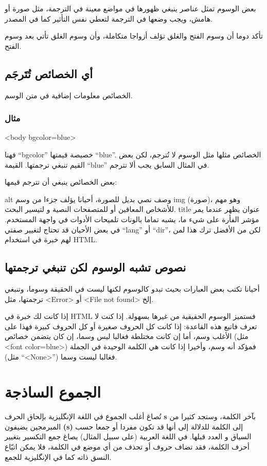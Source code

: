 بعض الوسوم تمثل عناصر ينبغي ظهورها في مواضع معينة في الترجمة، مثل صورة
أو هامش، ويجب وضعها في الترجمة لتعطي نفس التأثير كما في المصدر.

تأكد دوما أن وسوم الفتح والغلق تؤلف أزواجا متكاملة، وأن وسوم الغلق تأتي
بعد وسوم الفتح.

\subsection{أي الخصائص تُتَرجَم}
الخصائص معلومات إضافية في متن الوسم.

\subsubsection{مثال}
<body bgcolor=blue>

فهنا “bgcolor” خصيصة قيمتها “blue”. الخصائص مثلها مثل الوسوم لا تُترجم،
لكن بعض القيم تنبغي ترجمتها. القيمة “blue” في المثال السابق يجب ألا
تترجم.

بعض الخصائص ينبغي أن تترجم قيمها:

\starttable[|l|l|]
\HL
\NC {} \NC {}\NC\AR
\HL
\NC alt  \NC وصف نصي بديل للصورة، أحيانا يؤلف جزءا من وسم img (صورة)،
وهو مهم للأشخاص المعاقين أو للمتصفحات النصية و لتيسير البحث.\NC\AR
\HL
\NC title  \NC عنوان يظهر عندما يمر مؤشر الفأرة على شيء ما، يشبه تماما
بالونات تلميحات الأدوات في واجهة المستخدم.\NC\AR
\HL
\stoptable
في بعض الأحيان قد تحتاج لتغيير صفتي “lang” أو “dir”، لكن من الأفضل ترك
هذا لمن لهم خبرة في استخدام HTML.

\subsection{نصوص تشبه الوسوم لكن تنبغي ترجمتها}
أحيانا تكتب بعض العبارات بحيث تبدو كالوسوم لكنها ليست في الحقيقة وسوما،
وتنبغي ترجمتها، مثل <Error> أو <File not found> إلخ.

إذا كانت لك خبرة في HTML فستميز الوسوم الحقيقية من غيرها بسهولة. إذا كنت
لا تعرف فاتبع هذه القاعدة: إذا كانت كل الحروف صغيرة أو كل الحروف كبيرة
فهذا على الأغلب وسم، أما إن كانت مختلطة فغالبا ليس وسما، إن كان يتضمن
خصائص (مثل <font color=blue>) فمؤكد أنه وسم، وأخيرا إذا كانت هي الكلمة
الوحيدة في الجملة (مثل “<None>”) فغالبا ليست وسما.

\section{الجموع الساذجة}
تُصاغ أغلب الجموع في اللغة الإنگليزية بإلحاق الحرف {\bf s} بآخر الكلمة،
وستجد كثيرا من المبرمجين يضيفون {\bf (s)} إلى الكلمة للدلالة إلى أنها
قد تكون مفردا أو جمعا حسب السياق و العدد قبلها. في اللغة العربية (على
سبيل المثال) يصاغ جمع التكسير بتغيير أحرف الكلمة، فقد تضاف حروف أو تحذف
من أي موضع في الكلمة، فلا يمكن اتبّاع النسق ذاته كما في الإنگليزية
للجمع.

